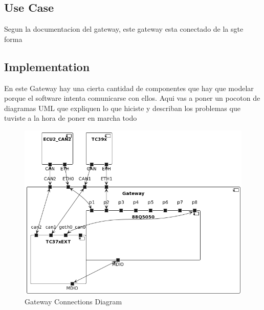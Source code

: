 \subsection{Use Case}
Segun la documentacion del gateway, este gateway esta conectado de la sgte forma
\subsection{Implementation}
En este Gateway hay una cierta cantidad de componentes que hay que modelar porque el software intenta comunicarse con ellos.
Aqui vas a poner un pocoton de diagramas UML que expliquen lo que hiciste y describan los problemas que tuviste a la hora de poner en marcha todo

\begin{figure}[!htb]
 \centering
 \includegraphics[width=\textwidth]{img/GWConnectionsDiagram.png}
 \caption{Gateway Connections Diagram}
 \label{fig:connections-diagram}
\end{figure}